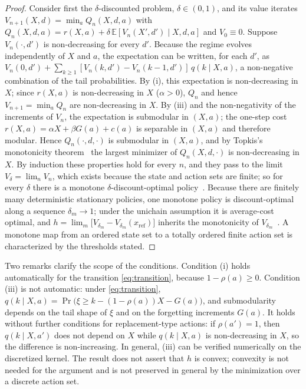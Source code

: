 \documentclass[electronics,article,submit,pdftex,moreauthors]{Definitions/mdpi}
\newcommand{\E}{\mathbb{E}}
\begin{document}
\begin{proof}
Consider first the $\delta$-discounted problem, $\delta\in(0,1)$, and its value iterates $V_{n+1}(X,d)=\min_a Q_n(X,d,a)$ with $Q_n(X,d,a)=r(X,a)+\delta\,\E[V_n(X',d')\mid X,d,a]$ and $V_0\equiv 0$. Suppose $V_n(\cdot,d')$ is non-decreasing for every $d'$. Because the regime evolves independently of $X$ and $a$, the expectation can be written, for each $d'$, as $V_n(0,d')+\sum_{k\ge 1}[V_n(k,d')-V_n(k-1,d')]\,q(k\mid X,a)$, a non-negative combination of the tail probabilities. By (i), this expectation is non-decreasing in $X$; since $r(X,a)$ is non-decreasing in $X$ ($\alpha>0$), $Q_n$ and hence $V_{n+1}=\min_a Q_n$ are non-decreasing in $X$. By (iii) and the non-negativity of the increments of $V_n$, the expectation is submodular in $(X,a)$; the one-step cost $r(X,a)=\alpha X+\beta G(a)+c(a)$ is separable in $(X,a)$ and therefore modular. Hence $Q_n(\cdot,d,\cdot)$ is submodular in $(X,a)$, and by Topkis's monotonicity theorem~\cite{Topkis1998} the largest minimizer of $Q_n(X,d,\cdot)$ is non-decreasing in $X$. By induction these properties hold for every $n$, and they pass to the limit $V_\delta=\lim_n V_n$, which exists because the state and action sets are finite; so for every $\delta$ there is a monotone $\delta$-discount-optimal policy~\cite{Puterman1994}. Because there are finitely many deterministic stationary policies, one monotone policy is discount-optimal along a sequence $\delta_m\to 1$; under the unichain assumption it is average-cost optimal, and $h=\lim_m\bigl[V_{\delta_m}-V_{\delta_m}(x_{\mathrm{ref}})\bigr]$ inherits the monotonicity of $V_{\delta_m}$~\cite{Puterman1994}. A monotone map from an ordered state set to a totally ordered finite action set is characterized by the thresholds stated.
\end{proof}

Two remarks clarify the scope of the conditions. Condition (i) holds automatically for the transition \eqref{eq:transition}, because $1-\rho(a)\ge 0$. Condition (iii) is not automatic: under \eqref{eq:transition}, $q(k\mid X,a)=\Pr\bigl(\xi\ge k-(1-\rho(a))X-G(a)\bigr)$, and submodularity depends on the tail shape of $\xi$ and on the forgetting increments $G(a)$. It holds without further conditions for replacement-type actions: if $\rho(a')=1$, then $q(k\mid X,a')$ does not depend on $X$ while $q(k\mid X,a)$ is non-decreasing in $X$, so the difference is non-increasing. In general, (iii) can be verified numerically on the discretized kernel. The result does not assert that $h$ is convex; convexity is not needed for the argument and is not preserved in general by the minimization over a discrete action set.
\end{document}
